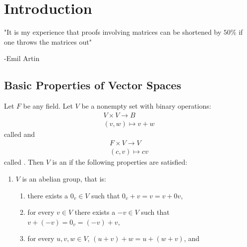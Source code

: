\chapter{Introduction}\label{chapter:introduction}

\vspace{12pt}
"It is my experience that proofs involving matrices can be shortened by $50\%$ if one throws the matrices out"

\quad\quad\quad\quad\quad\quad\quad\quad\quad\quad\quad\quad\quad\quad\quad\quad\quad\quad\quad\quad\quad\quad\quad\quad\quad\quad\quad\quad\quad\quad\quad\quad\quad -Emil Artin
\section{Basic Properties of Vector Spaces} 
    \begin{definition}
        Let $F$ be any field. Let $V$ be a nonempty set with binary operations:
            \begin{equation*}
            \begin{split}
                V \times V \rightarrow B \\
                (v,w) \mapsto v+w
            \end{split}
            \end{equation*}
        called  and
            \begin{equation*}
            \begin{split}
                F \times V \rightarrow V \\
                (c,v) \mapsto cv
            \end{split}
            \end{equation*}
        called . Then $V$ is an  if the following properties are satisfied:
            \begin{enumerate}[label = (\arabic*)]
                \item $V$ is an abelian group, that is:
                    \begin{enumerate}[label = (\roman*)]
                        \item there exists a $0_v \in V$ such that $0_v + v = v = v + 0v$,
                        \item for every $v \in V$ there exists a $-v \in V$ such that $v+(-v) = 0_v = (-v) + v$,
                        \item for every $u,v,w \in V$, $(u+v) + w = u + (w+v)$, and

\end{enumerate}
\end{enumerate}
\end{definition}
